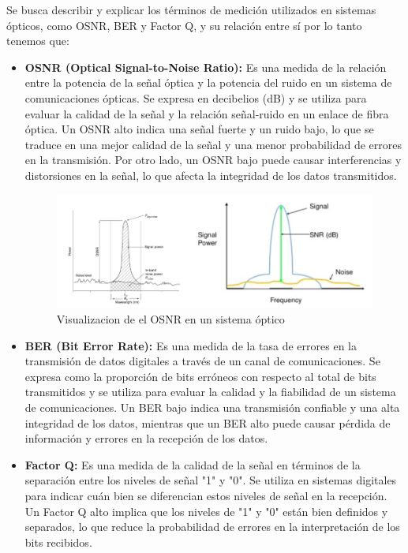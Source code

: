 \begin{enumerate}
		Se busca describir y explicar los términos de medición utilizados en sistemas ópticos, como OSNR, BER y Factor Q, y su relación entre sí por lo tanto tenemos que:

		\begin{itemize}
			\item \textbf{OSNR (Optical Signal-to-Noise Ratio):} Es una medida de la relación entre la potencia de la señal óptica y la potencia del ruido en un sistema de comunicaciones ópticas. Se expresa en decibelios (dB) y se utiliza para evaluar la calidad de la señal y la relación señal-ruido en un enlace de fibra óptica. Un OSNR alto indica una señal fuerte y un ruido bajo, lo que se traduce en una mejor calidad de la señal y una menor probabilidad de errores en la transmisión. Por otro lado, un OSNR bajo puede causar interferencias y distorsiones en la señal, lo que afecta la integridad de los datos transmitidos.
			\begin{figure}
				\centering
				\includegraphics[width=0.7\linewidth]{img/Figure_5_0}
				\caption{Visualizacion de el OSNR en un sistema óptico}
				\label{fig:6}
			\end{figure}
			\item \textbf{BER (Bit Error Rate):} Es una medida de la tasa de errores en la transmisión de datos digitales a través de un canal de comunicaciones. Se expresa como la proporción de bits erróneos con respecto al total de bits transmitidos y se utiliza para evaluar la calidad y la fiabilidad de un sistema de comunicaciones. Un BER bajo indica una transmisión confiable y una alta integridad de los datos, mientras que un BER alto puede causar pérdida de información y errores en la recepción de los datos.
			\item \textbf{Factor Q:} Es una medida de la calidad de la señal en términos de la separación entre los niveles de señal "1" y "0". Se utiliza en sistemas digitales para indicar cuán bien se diferencian estos niveles de señal en la recepción. Un Factor Q alto implica que los niveles de "1" y "0" están bien definidos y separados, lo que reduce la probabilidad de errores en la interpretación de los bits recibidos.
			\begin{figure}

\end{figure}
\end{itemize}
\end{enumerate}
